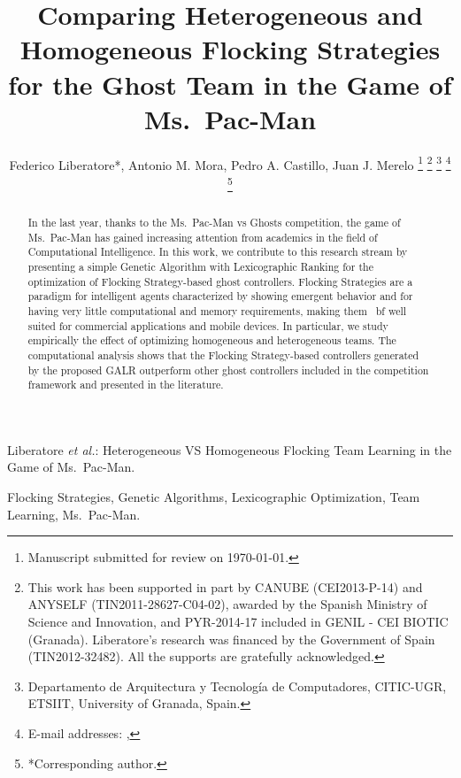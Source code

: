 \documentclass[journal]{IEEEtran}
\begin{document}
\title{Comparing Heterogeneous and Homogeneous Flocking Strategies for the Ghost Team in the Game of Ms.\  Pac-Man}

\author{Federico Liberatore*, Antonio M. Mora, Pedro A. Castillo, Juan J. Merelo
\thanks{Manuscript submitted for review on \today.}%
\thanks{This work has been supported in part by CANUBE (CEI2013-P-14) and ANYSELF (TIN2011-28627-C04-02), awarded by the Spanish Ministry of Science and Innovation, and PYR-2014-17 included in GENIL - CEI BIOTIC (Granada). Liberatore's research was financed by the Government of Spain (TIN2012-32482). All the supports are gratefully acknowledged.}%
\thanks{Departamento de Arquitectura y Tecnolog\'ia de Computadores,
CITIC-UGR, ETSIIT,
University of Granada, Spain.}%
\thanks{E-mail addresses: \mailsa, \mailsb}%
\thanks{*Corresponding author.}}

%
{Liberatore \MakeLowercase{\textit{et al.}}: Heterogeneous VS Homogeneous Flocking Team Learning in the Game of Ms.\  Pac-Man.}
\maketitle

\begin{abstract}
In the last year, thanks to the Ms.\  Pac-Man vs Ghosts competition, the
game of Ms.\  Pac-Man has gained increasing attention from academics in
the field of Computational Intelligence. In this work, we contribute
to this research stream by presenting a simple Genetic
Algorithm with Lexicographic Ranking for the optimization of Flocking Strategy-based ghost controllers. Flocking Strategies are a paradigm for intelligent agents
characterized by showing emergent behavior and for having very little
computational and memory requirements, making them {\ bf well suited} for
commercial applications and mobile devices. In particular, we study
empirically the effect of optimizing homogeneous and heterogeneous
teams. The computational analysis shows that the Flocking
Strategy-based controllers generated by the proposed GALR outperform other ghost controllers
included in the competition framework and presented in the
literature. 
\end{abstract}
\begin{IEEEkeywords}
Flocking Strategies, Genetic Algorithms, Lexicographic Optimization, Team Learning, Ms.\  Pac-Man.
\end{IEEEkeywords}
\end{document}
